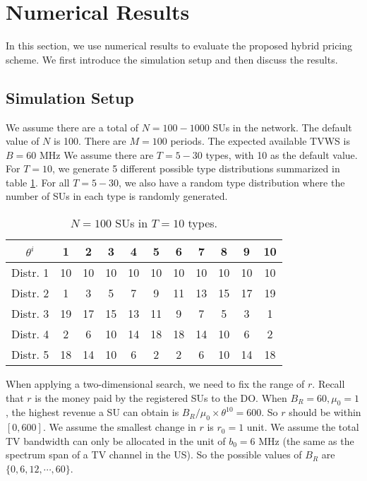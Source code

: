 \documentclass[journal]{IEEEtran}
\begin{document}
\section{Numerical Results}
\label{sec:simulation}

In this section, we use numerical results to evaluate the proposed hybrid pricing scheme. We first introduce the simulation setup and then discuss the results.

\subsection{Simulation Setup}

We assume there are a total of $N=100-1000$ SUs in the network. The default value of $N$ is 100. There are $M=100$ periods.
The expected available TVWS is $B=60$ MHz \cite{TVWS_availability1}\cite{TVWS_availability2}
We assume there are $T=5-30$ types, with 10 as the default value.
For $T=10$, we generate 5 different possible type distributions summarized in table \ref{tab:distributions}.
For all $T=5-30$, we also have a random type distribution where the number of SUs in each type is randomly generated.

\begin{table}[tp]
\renewcommand{\arraystretch}{0.9}
\caption{$N=100$ SUs in $T=10$ types.}
\label{tab:distributions}
\centering
\begin{tabular}{|c|c|c|c|c|c|c|c|c|c|c|}
  \hline
$\theta^i$   & 1  & 2  & 3  & 4  & 5  & 6  & 7  & 8  & 9  & 10  \\
  \hline
  Distr. 1     & 10 & 10 & 10 & 10 & 10 & 10 & 10 & 10 & 10 & 10 \\
  \hline
  Distr. 2     & 1  & 3  & 5  & 7  & 9  & 11 & 13 & 15 & 17 & 19 \\
  \hline
  Distr. 3     & 19 & 17 & 15 & 13 & 11 & 9  & 7  & 5  & 3  & 1  \\
  \hline
  Distr. 4     & 2  & 6  & 10 & 14 & 18 & 18 & 14 & 10 & 6  & 2  \\
  \hline
  Distr. 5     & 18 & 14 & 10 & 6  & 2  & 2  & 6  & 10 & 14 & 18 \\
  \hline
\end{tabular}
\end{table}

When applying a two-dimensional search, we need to fix the range of $r$. Recall that $r$ is the money paid by the registered SUs to the DO. When $B_R=60, \mu_0=1$, the highest revenue a SU can obtain is $B_R/\mu_0\times\theta^{10}=600$. So $r$ should be within $[0, 600]$. We assume the smallest change in $r$ is $r_0=1$ unit. We assume the total TV bandwidth can only be allocated in the unit of $b_0=6$ MHz (the same as the spectrum span of a TV channel in the US). So the possible values of $B_R$ are $\{0, 6, 12, \cdots, 60\}$.
\end{document}
